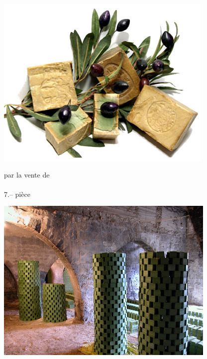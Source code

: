 \documentclass[frenchb,16pt,parskip=half-]{scrartcl}
\begin{document}
\begin{center}
\end{center}\vspace{-2em}
\begin{minipage}[c]{5cm}
    \includegraphics[width=\linewidth]{img/sav04.jpg}
\end{minipage}\hfill
\begin{minipage}[c]{8.5cm}\centering\huge
   par la vente de\\ \\ 7.-- pièce
\end{minipage}\hfill
\begin{minipage}[c]{5cm}
    \includegraphics[width=\linewidth]{img/sav03.jpg}
\end{minipage}\vfill
\end{document}
